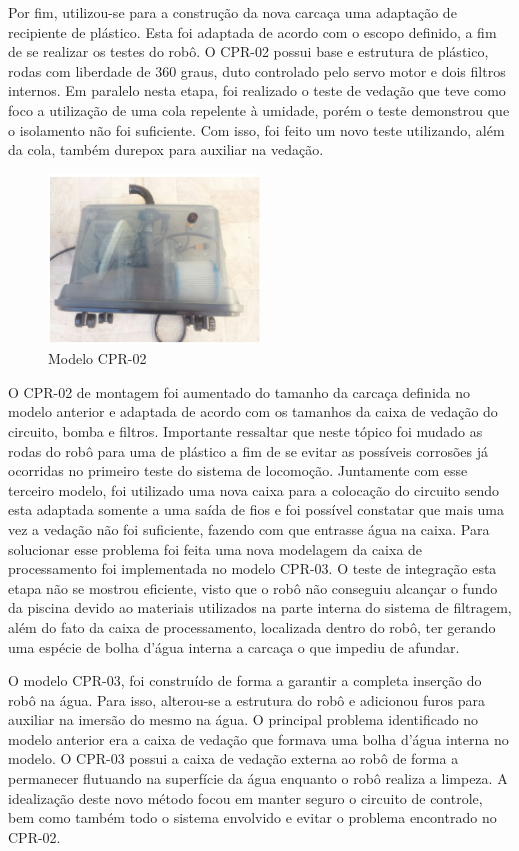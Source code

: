 Por fim, utilizou-se para a construção da nova carcaça uma adaptação de recipiente de plástico. Esta foi adaptada de acordo com o escopo definido, a fim de se realizar os testes do robô. O CPR-02 possui base e estrutura de plástico, rodas com liberdade de 360 graus, duto controlado pelo servo motor e dois filtros internos. Em paralelo nesta etapa, foi realizado o teste de vedação que teve como foco a utilização de uma cola repelente à umidade, porém o teste demonstrou que o isolamento não foi suficiente. Com isso, foi feito um novo teste utilizando, além da cola, também durepox para auxiliar na vedação. 

\begin{figure}[h]
  \centering
  \includegraphics[width=0.5\textwidth]{figuras/cpr-02.png}
  \caption{Modelo CPR-02}
  \label{fig:cpr-02}
\end{figure}
\FloatBarrier

O CPR-02 de montagem foi aumentado do tamanho da carcaça definida no modelo anterior e adaptada de acordo com os tamanhos da caixa de vedação do circuito, bomba e filtros. Importante ressaltar que neste tópico foi mudado as rodas do robô para uma de plástico a fim de se evitar as possíveis corrosões já ocorridas no primeiro teste do sistema de locomoção. Juntamente com esse terceiro modelo, foi utilizado uma nova caixa para a colocação do circuito sendo esta adaptada somente a uma saída de fios e foi possível constatar que mais uma vez a vedação não foi suficiente, fazendo com que entrasse água na caixa. Para solucionar esse problema foi feita uma nova modelagem da caixa de processamento foi implementada no modelo CPR-03. O teste de integração esta etapa não se mostrou eficiente, visto que o robô não conseguiu alcançar o fundo da piscina devido ao materiais utilizados na parte interna do sistema de filtragem, além do fato da caixa de processamento, localizada dentro do robô, ter gerando uma espécie de bolha d’água interna a carcaça o que impediu de afundar.

O modelo CPR-03, foi construído de forma a garantir a completa inserção do robô na água. Para isso, alterou-se a estrutura do robô e adicionou furos para auxiliar na imersão do mesmo na água. O principal problema identificado no modelo anterior era a caixa de vedação que formava uma bolha d’água interna no modelo. O CPR-03 possui a caixa de vedação externa ao robô de forma a permanecer flutuando na superfície da água enquanto o robô realiza a limpeza. A idealização deste novo método focou em manter seguro o circuito de controle, bem como também todo o sistema envolvido e evitar o problema encontrado no  CPR-02.

